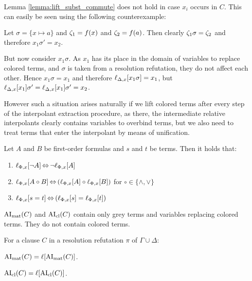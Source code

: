 \documentclass[,%
	paper=a4,%
	DIV14, %
	twoside=false,%
	liststotoc,
	bibtotoc,
	draft=false,%
	numbers=noendperiod
]{scrartcl}
\begin{document}
\begin{remark}
	Lemma \ref{lemma:lift_subst_commute} does not hold in case $x_i$ occurs in $C$.
	This can easily be seen using the following counterexample:


	Let $\sigma = \{x \mapsto a\}$ and $\colterm{1} = f(x)$ and $\colterm{2} = f(a)$. 
	Then clearly $\colterm{1}\sigma = \colterm{2}$ and therefore $x_1\sigma' = x_2$.

	But now consider $x_1 \sigma$. 
	As $x_1$ has its place in the domain of variables to replace colored terms, and $\sigma$ is taken from a resolution refutation, they do not affect each other. 
	Hence $x_1\sigma = x_1$ and therefore $\lifdelta{x_1\sigma} = x_1$, but $\lifdelta{x_1}\sigma' = \lifdelta{x_1}\sigma' = x_2$.


	However such a situation arises naturally if we lift colored terms after every step of the interpolant extraction procedure, as there, the intermediate relative interpolants clearly contains variables to overbind terms, but we also need to treat terms that enter the interpolant by means of unification.
\end{remark}

\begin{lemma}
	\label{lemma:lift_logic_commute}
	Let $A$ and $B$ be first-order formulas and $s$ and $t$ be terms. Then it holds that:
	\begin{enumerate}
		\item $\lift{\Phi}{\lnot A}{x} \semiff{} \lnot \lift{\Phi}{A}{x}$
		\item $\lift{\Phi}{A \circ B}{x} \semiff{} ( \lift{\Phi}{A}{x} \circ \lift{\Phi}{B}{x} )$ for  $\circ \in     \{\land, \lor\}$
		\item $\lift{\Phi}{s = t}{x} \semiff{} ( \lift{\Phi}{s}{x} = \lift{\Phi}{t}{x} )$
	\end{enumerate}
\end{lemma}



\begin{lemma}
	\label{lemma:no_colored_terms}
	$\AImatrix(C)$ and $\AIclause(C)$ contain only grey terms and variables replacing colored terms. They do not contain colored terms.
\end{lemma}



\begin{corr}
	\label{corr:lift_ai}
	For a clause $C$ in a resolution refutation $\pi$ of $\Gamma \cup \Delta$:
	\begin{compactenum}
	\item $\AImatrix(C) = \lifboth{\AImatrix(C)}$.

	\item $\AIclause(C) = \lifboth{\AIclause(C)}$.
	\end{compactenum}
\end{corr}
\end{document}
